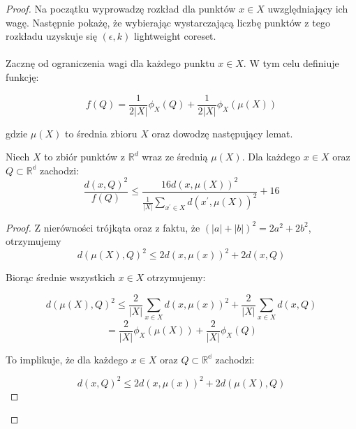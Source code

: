 \begin{proof}

Na początku wyprowadzę rozkład dla punktów $x \in X$ uwzględniający ich wagę.
Następnie pokażę, że wybierając wystarczającą liczbę punktów z tego rozkładu uzyskuje się $(\epsilon, k)$ lightweight coreset. 
\\~\\
Zacznę od ograniczenia wagi dla każdego punktu $x \in X$. 
W tym celu definiuje funkcję:

\begin{equation}
    f(Q) = \frac{1}{2|X|}\phi_{X}(Q) + \frac{1}{2|X|}\phi_{X}(\mu(X))
\end{equation}

\noindent
gdzie $\mu(X)$ to średnia zbioru $X$ oraz dowodzę następujący lemat. 

\begin{lemma}
    Niech $X$ to zbiór punktów z $\mathbb{R}^{d}$ wraz ze średnią $\mu(X)$. 
    Dla każdego $x \in X$ oraz $Q \subset \mathbb{R^d}$ zachodzi:
    \begin{equation}
        \frac{d(x, Q)^2}{f(Q)} \leq \frac{16d(x, \mu(X))^2}{\frac{1}{|X|}\sum_{x^{'} \in X}d(x^{'}, \mu(X))^2} + 16
    \end{equation}
\end{lemma}

\begin{proof}
    \noindent
    Z nierówności trójkąta oraz z faktu, że $(|a| + |b|)^2 = 2a^2 + 2b^2$, otrzymujemy
    \begin{equation}
        d(\mu(X), Q)^2 \leq 2d(x, \mu(x))^2 + 2d(x, Q)
    \end{equation}
    
    \noindent
    Biorąc średnie wszystkich $x \in X$ otrzymujemy:

    \begin{equation}
        d(\mu(X), Q)^2 \leq \frac{2}{|X|} \sum_{x \in X} d(x, \mu(x))^2 + \frac{2}{|X|} \sum_{x \in X} d(x, Q)
    \end{equation}
    \begin{equation}
       = \frac{2}{|X|} \phi_{X}(\mu(X))+ \frac{2}{|X|} \phi_{X}(Q)
    \end{equation}

    \noindent
    To implikuje, że dla każdego $x \in X$ oraz $Q \subset \mathbb{R^d}$ zachodzi:

    \begin{equation}
        d(x, Q)^2 \leq 2d(x, \mu(x))^2 + 2d(\mu(X), Q)
    \end{equation}


\end{proof}
\end{proof}
